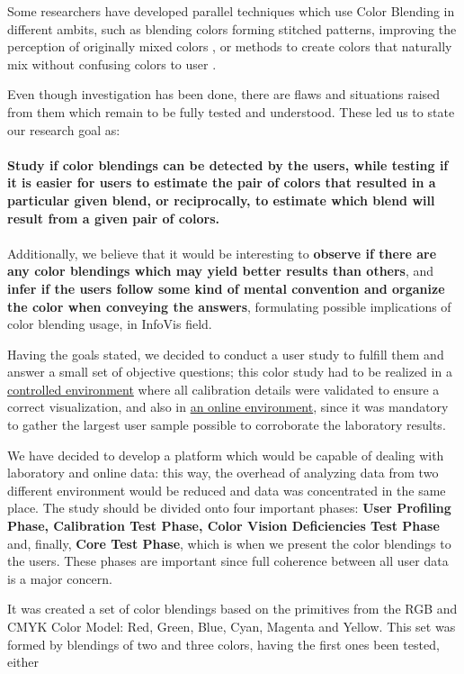 %
Some researchers have developed parallel techniques which use Color Blending in different
ambits, such as blending colors forming stitched patterns, improving the perception of originally mixed
colors \cite{Urness2003}, or methods to create colors that naturally mix without confusing colors to user \cite{Chuang2009}. \par
%
Even though investigation has been done, there are flaws and situations raised from them which remain to be fully
tested and understood. These led us to state our research goal as: \\ \\
%
\textbf{Study if color blendings can be detected by the users, while testing if it is easier for
users to estimate the pair of colors that resulted in a particular given blend, or reciprocally, to estimate
which blend will result from a given pair of colors.} \\ \\
%
Additionally, we believe that it would be interesting to \textbf{observe if there are any color blendings which
may yield better results than others}, and \textbf{infer if the users follow some kind of mental convention and
organize the color when conveying the answers}, formulating possible implications of color blending usage, in
InfoVis field. \par
%
Having the goals stated, we decided to conduct a user study to fulfill them and answer a small set of objective
questions; this color study had to be realized in a \ul{controlled environment} where all calibration
details were validated to ensure a correct visualization, and also in \ul{an online environment}, since it
was mandatory to gather the largest user sample possible to corroborate the laboratory results. \par
%
We have decided to develop a platform which would be capable of dealing with laboratory and online data: this way,
the overhead of analyzing data from two different environment would be reduced and data was concentrated in the same
place. The study should be divided onto four important phases: \textbf{User Profiling Phase, Calibration Test Phase,
Color Vision Deficiencies Test Phase} and, finally, \textbf{Core Test Phase}, which is when we present the color
blendings to the users. These phases are important since full coherence between all user data is a major concern. \par
%
It was created a set of color blendings based on the primitives from the RGB and CMYK Color Model: Red, Green, Blue,
Cyan, Magenta and Yellow. This set was formed by blendings of two and three colors, having the first ones been tested, either
